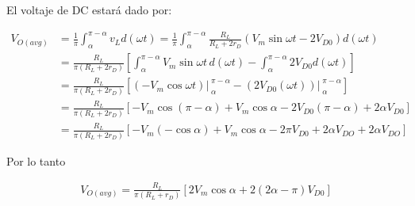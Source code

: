\documentclass{article}
\begin{document}
El voltaje de DC estará dado por:

\begin{align}
	V_{O(avg)} &= \frac{1}{\pi} \int_{\alpha}^{\pi - \alpha} v_L d(\omega t) = \frac{1}{\pi} \int_{\alpha}^{\pi - \alpha} \frac{R_L}{R_L + 2r_D} \left( V_m \sin \omega t - 2V_{D0} \right) d(\omega t) \nonumber \\
	&= \frac{R_L}{\pi (R_L + 2r_D)} \left[ \int_{\alpha}^{\pi - \alpha} V_m \sin \omega t \, d(\omega t) - \int_{\alpha}^{\pi - \alpha} 2V_{D0} d(\omega t) \right] \nonumber \\
	&= \frac{R_L}{\pi (R_L + 2r_D)} \left[  \left.{\left( -V_m \cos \omega t \right)}\right|_{\;\alpha}^{\;\pi - \alpha} - \left.{\left( 2V_{D0}(\omega t) \right)}\right|_{\;\alpha}^{\;\pi - \alpha} \right] \nonumber \\
	&= \frac{R_L}{\pi (R_L + 2r_D)} \left[ -V_m \cos (\pi - \alpha) + V_m \cos \alpha - 2V_{D0}(\pi - \alpha) + 2\alpha V_{D0} \right] \nonumber \\
	&= \frac{R_L}{\pi (R_L + 2r_D)} \left[ -V_m (-\cos \alpha) + V_m \cos \alpha - 2\pi V_{D0} + 2\alpha V_{DO} + 2\alpha V_{DO} \right] \nonumber
\end{align}

Por lo tanto

\begin{align}
	V_{O(avg)} = \frac{R_L}{\pi (R_L + r_D)} \left[ 2V_m \cos \alpha + 2(2\alpha - \pi)V_{D0} \right]
\end{align}
\end{document}
